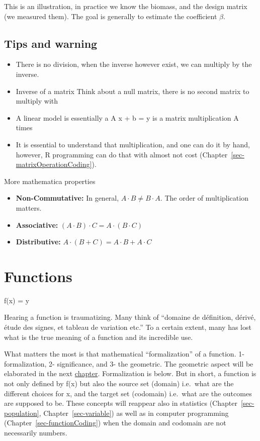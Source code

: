 \documentclass[
  letterpaper,
  DIV=11,
  numbers=noendperiod]{scrreprt}
\providecommand{\tightlist}{%
  \setlength{\itemsep}{0pt}\setlength{\parskip}{0pt}}
\begin{document}
This is an illustration, in practice we know the biomass, and the design
matrix (we measured them). The goal is generally to estimate the
coefficient \(\beta\).

\section*{Tips and warning}\label{tips-and-warning-5}


\begin{itemize}
\tightlist
\item
  There is no division, when the inverse however exist, we can multiply
  by the inverse.
\item
  Inverse of a matrix Think about a null matrix, there is no second
  matrix to multiply with
\item
  A linear model is essentially a A x + b = y is a matrix multiplication
  A times
\item
  It is essential to understand that multiplication, and one can do it
  by hand, however, R programming can do that with almost not cost
  (Chapter~\ref{sec-matrixOperationCoding}).
\end{itemize}

More mathematica properties

\begin{itemize}
\tightlist
\item
  \textbf{Non-Commutative:} In general, \(A \cdot B \neq B \cdot A\).
  The order of multiplication matters.
\item
  \textbf{Associative:} \((A \cdot B) \cdot C = A \cdot (B \cdot C)\)
\item
  \textbf{Distributive:} \(A \cdot (B + C) = A \cdot B + A \cdot C\)
\end{itemize}

\chapter{Functions}\label{sec-functionMath}

f(x) = y

Hearing a function is traumatizing. Many think of ``domaine de
définition, dérivé, étude des signes, et tableau de variation etc.'' To
a certain extent, many has lost what is the true meaning of a function
and its incredible use.

What matters the most is that mathematical ``formalization'' of a
function. 1- formalization, 2- significance, and 3- the geometric. The
geometric aspect will be elaborated in the next
\href{@sec-function_viz}{chapter}. Formalization is below. But in short,
a function is not only defined by f(x) but also the source set (domain)
i.e.~what are the different choices for x, and the target set (codomain)
i.e.~what are the outcomes are supposed to be. These concepts will
reappear also in statistics (Chapter~\ref{sec-population},
Chapter~\ref{sec-variable}) as well as in computer programming
(Chapter~\ref{sec-functionCoding}) when the domain and codomain are not
necessarily numbers.
\end{document}
